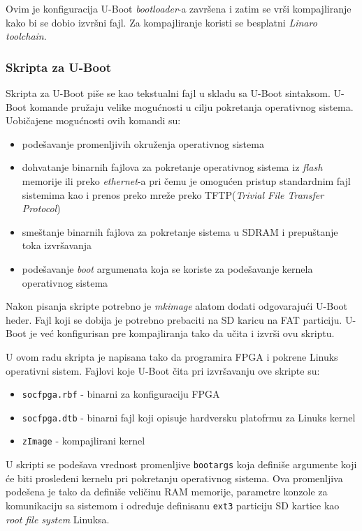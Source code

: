 Ovim je konfiguracija U-Boot \textit{bootloader}-a završena i zatim se vrši kompajliranje kako bi se dobio izvršni fajl. Za kompajliranje koristi se besplatni \textit{Linaro toolchain}.
\subsubsection{Skripta za U-Boot}
Skripta za U-Boot piše se kao tekstualni fajl u skladu sa U-Boot sintaksom. U-Boot komande pružaju velike mogućnosti u cilju pokretanja operativnog sistema. Uobičajene mogućnosti ovih komandi su:
\begin{itemize}
\item podešavanje promenljivih okruženja operativnog sistema
\item dohvatanje binarnih fajlova za pokretanje operativnog sistema iz \textit{flash} memorije ili preko \textit{ethernet}-a pri čemu je omogućen pristup standardnim fajl sistemima kao i prenos preko mreže preko TFTP(\textit{Trivial File Transfer Protocol})
\item smeštanje binarnih fajlova za pokretanje sistema u SDRAM i prepuštanje toka izvršavanja
\item podešavanje \textit{boot} argumenata koja se koriste za podešavanje kernela operativnog sistema
\end{itemize}

Nakon pisanja skripte potrebno je \textit{mkimage} alatom dodati odgovarajući U-Boot heder. Fajl koji se dobija je potrebno prebaciti na SD karicu na FAT particiju. U-Boot je već konfigurisan pre kompajliranja tako da učita i izvrši ovu skriptu.

U ovom radu skripta je napisana tako da programira FPGA i pokrene Linuks operativni sistem. Fajlovi koje U-Boot čita pri izvršavanju ove skripte su:
\begin{itemize}
\item \texttt{socfpga.rbf} - binarni za konfiguraciju FPGA
\item \texttt{socfpga.dtb} - binarni fajl koji opisuje hardversku platofrmu za Linuks kernel
\item \texttt{zImage} - kompajlirani kernel
\end{itemize}

U skripti se podešava vrednost promenljive \texttt{bootargs} koja definiše argumente koji će biti prosleđeni kernelu pri pokretanju operativnog sistema. Ova promenljiva podešena je tako da definiše veličinu RAM memorije, parametre konzole za komunikaciju sa sistemom i određuje definisanu \texttt{ext3} particiju SD kartice kao \textit{root file system} Linuksa.


